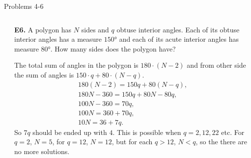 \documentclass[9pt,aspectratio=169]{beamer}
\begin{document}
\begin{frame}{Problems 4-6}
\begin{columns}[T]
\begin{column}{0.5\textwidth}
    \end{column}
    \begin{column}{0.5\textwidth}
      \begin{problem}
        \textbf{E6.} A polygon has $N$ sides and $q$ obtuse interior angles. Each of its obtuse interior angles has a measure $150°$ and each of its acute interior angles has measure $80°$. How many sides does the polygon have?
      \end{problem}
      The total sum of angles in the polygon is $180 \cdot (N - 2)$ and from other side the sum of angles is $150 \cdot q + 80 \cdot (N - q)$.
      \begin{gather*}
        180 (N - 2) = 150 q + 80 (N - q),\\
        180 N - 360 = 150 q + 80 N - 80 q,\\
        100 N - 360 = 70 q, \\
        100 N = 360 + 70 q, \\
        10 N = 36 + 7q.
      \end{gather*}
      So $7q$ should be ended up with $4$. This is possible when $q = 2, 12, 22$ etc. For $q = 2$, $\boxed{N = 5}$, for $q = 12$, $\boxed{N = 12}$, but for each $q> 12$, $N < q$, so the there are no more solutions. 
    \end{column}
  \end{columns}
\end{frame}
\end{document}
